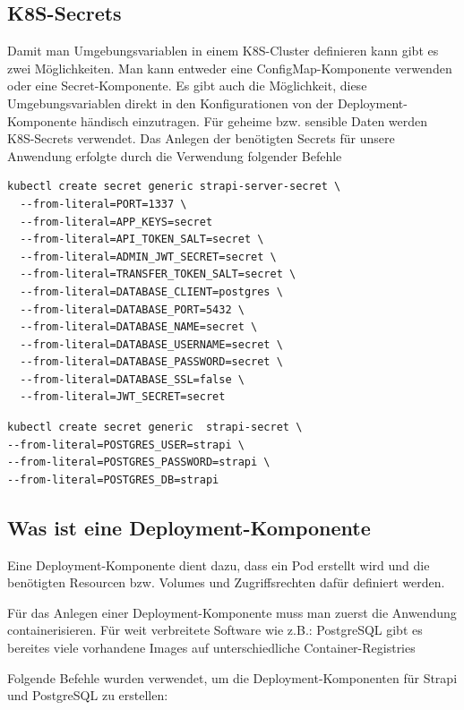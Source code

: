\subsection{K8S-Secrets}
Damit man Umgebungsvariablen in einem K8S-Cluster definieren kann gibt es zwei Möglichkeiten.
Man kann entweder eine ConfigMap-Komponente verwenden oder eine Secret-Komponente. Es gibt auch die Möglichkeit, diese Umgebungsvariablen direkt in den Konfigurationen von der Deployment-Komponente händisch einzutragen.
Für geheime bzw. sensible Daten werden K8S-Secrets verwendet.
Das Anlegen der benötigten Secrets für unsere Anwendung erfolgte durch die Verwendung folgender Befehle
\begin{lstlisting}[caption=Secrets für Strapi]
    kubectl create secret generic strapi-server-secret \
  --from-literal=PORT=1337 \  
  --from-literal=APP_KEYS=secret
  --from-literal=API_TOKEN_SALT=secret \
  --from-literal=ADMIN_JWT_SECRET=secret \
  --from-literal=TRANSFER_TOKEN_SALT=secret \
  --from-literal=DATABASE_CLIENT=postgres \
  --from-literal=DATABASE_PORT=5432 \
  --from-literal=DATABASE_NAME=secret \
  --from-literal=DATABASE_USERNAME=secret \
  --from-literal=DATABASE_PASSWORD=secret \
  --from-literal=DATABASE_SSL=false \
  --from-literal=JWT_SECRET=secret
\end{lstlisting}


\begin{lstlisting}[caption=Secrets für die Datenbank]
kubectl create secret generic  strapi-secret \
--from-literal=POSTGRES_USER=strapi \
--from-literal=POSTGRES_PASSWORD=strapi \
--from-literal=POSTGRES_DB=strapi
\end{lstlisting}








\subsection{Was ist eine Deployment-Komponente}

Eine Deployment-Komponente dient dazu, dass ein Pod erstellt wird und die benötigten Resourcen bzw. Volumes und Zugriffsrechten
dafür definiert werden.\cite{k8s-deployment}

Für das Anlegen einer Deployment-Komponente muss man zuerst die Anwendung containerisieren.
Für weit verbreitete Software wie z.B.: PostgreSQL gibt es bereites viele vorhandene Images auf unterschiedliche Container-Registries

Folgende Befehle wurden verwendet, um die Deployment-Komponenten für Strapi und PostgreSQL zu erstellen:

